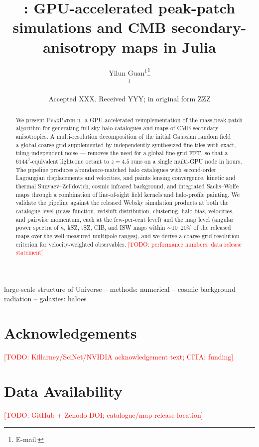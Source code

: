 \documentclass[fleqn,usenatbib]{mnras}
\title[GPU peak-patch simulations in Julia]{\ppjl: GPU-accelerated peak-patch
simulations and CMB secondary-anisotropy maps in Julia}
\author[Y. Guan et al.]{
Yilun Guan$^{1}$\thanks{E-mail: \todo{email}}
\todo{author list and affiliations}
\\
$^{1}$\todo{affiliation}
}
\date{Accepted XXX. Received YYY; in original form ZZZ}
\newcommand{\todo}[1]{\textcolor{red}{[TODO: #1]}}
\newcommand{\pkg}[1]{\textsc{#1}}
\newcommand{\ppjl}{\pkg{PeakPatch.jl}}
\begin{document}
\label{firstpage}
\pagerange{\pageref{firstpage}--\pageref{lastpage}}
\maketitle

\begin{abstract}
We present \ppjl, a GPU-accelerated reimplementation of the mass-peak-patch
algorithm for generating full-sky halo catalogues and maps of CMB secondary
anisotropies. A multi-resolution decomposition of the initial Gaussian random
field --- a global coarse grid supplemented by independently synthesized fine
tiles with exact, tiling-independent noise --- removes the need for a global
fine-grid FFT, so that a $6144^3$-equivalent lightcone octant to $z=4.5$ runs
on a single multi-GPU node in hours. The pipeline produces abundance-matched
halo catalogues with second-order Lagrangian displacements and velocities, and
paints lensing convergence, kinetic and thermal Sunyaev--Zel'dovich, cosmic
infrared background, and integrated Sachs--Wolfe maps through a combination of
line-of-sight field kernels and halo-profile painting. We validate the pipeline
against the released Websky simulation products at both the catalogue level
(mass function, redshift distribution, clustering, halo bias, velocities, and
pairwise momentum, each at the few-per-cent level) and the map level
(angular power spectra of $\kappa$, kSZ, tSZ, CIB, and ISW maps within
$\sim$10--20\% of the released maps over the well-measured multipole ranges),
and we derive a coarse-grid resolution criterion for velocity-weighted
observables. \todo{performance numbers; data release statement}
\end{abstract}

\begin{keywords}
large-scale structure of Universe -- methods: numerical -- cosmic background
radiation -- galaxies: haloes
\end{keywords}












\section*{Acknowledgements}
\todo{Killarney/SciNet/NVIDIA acknowledgement text; CITA; funding}

\section*{Data Availability}
\todo{GitHub + Zenodo DOI; catalogue/map release location}




% 
% 
% 
% 

\bsp
\label{lastpage}
\end{document}

